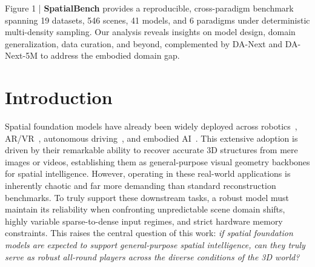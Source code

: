 \documentclass{llmxive}
\providecommand{\benchmark}{SpatialBench\xspace}
\providecommand{\dataset}{DA-Next-5M\xspace}
\providecommand{\ours}{DA-Next\xspace}
\begin{document}
\vspace{7pt}
{\centering

\par\vspace{6pt}
\begin{minipage}{\textwidth}
\footnotesize
{}\label{fig:teaser}
Figure 1 | \textbf{\benchmark} provides a reproducible, cross-paradigm benchmark spanning 19 datasets, 546 scenes, 41 models, and 6 paradigms under deterministic multi-density sampling.
Our analysis reveals insights on model design, domain generalization, data curation, and beyond, complemented by \ours and \dataset to address the embodied domain gap.
\end{minipage}
\par}

\vspace{8pt}


\section{Introduction}

Spatial foundation models have already been widely deployed across robotics~\citep{yang2026robo3r,lin2025evo,zhang2025spatial}, AR/VR~\citep{yang2026neoverse}, autonomous driving~\citep{chen2025dggt}, and embodied AI~\citep{kareer2025egomimic,zheng2026egoscale}. 
%
This extensive adoption is driven by their remarkable ability to recover accurate 3D structures from mere images or videos, establishing them as general-purpose visual geometry backbones for spatial intelligence. 
%
However, operating in these real-world applications is inherently chaotic and far more demanding than standard reconstruction benchmarks. 
%
To truly support these downstream tasks, a robust model must maintain its reliability when confronting unpredictable scene domain shifts, highly variable sparse-to-dense input regimes, and strict hardware memory constraints. 
%
This raises the central question of this work: \emph{if spatial foundation models are expected to support general-purpose spatial intelligence, can they truly serve as robust all-round players across the diverse conditions of the 3D world?}
\end{document}

